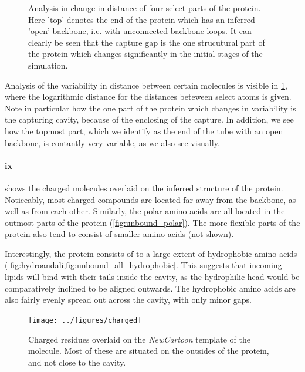 \documentclass[10pt]{article}\usepackage[]{graphicx}\usepackage[]{color}
\theoremstyle{plain}
\begin{document}
\begin{multicols*}{2}
\begin{Schunk}
\begin{figure}[H]
{}

\caption[Analysis in change in distance of four select parts of the protein]{Analysis in change in distance of four select parts of the protein. Here 'top' denotes the end of the protein which has an inferred 'open' backbone, i.e. with unconnected backbone loops. It can clearly be seen that the capture gap is the one strucutural part of the protein which changes significantly in the initial stages of the simulation.}\label{fig:dists}
\end{figure}
\end{Schunk}
		
		
	Analysis of the variability in distance between certain molecules is visible in \cref{fig:dists}, where the logarithmic distance for the distances beteween select atoms is given. Note in particular how the one part of the protein which changes in variability is the capturing cavity, because of the enclosing of the capture. In addition, we see how the topmost part, which we identify as the end of the tube with an open backbone, is contantly very variable, as we also see visually.
		
	\paragraph*{ix}
   shows the charged molecules overlaid on the inferred structure of the protein. Noticeably, most charged compounds are located far away from the backbone, as well as from each other. Similarly, the polar amino acids are all located in the outmost parts of the protein (\cref{fig:unbound_polar}). The more flexible parts of the protein also tend to consist of smaller amino acids (not shown).
		
		Interestingly, the protein consists of to a large extent of hydrophobic amino acids ({\cref{fig:hydroandali,fig:unbound_all_hydrophobic}}. This suggests that incoming lipids will bind with their tails inside the cavity, as the hydrophilic head would be comparatively inclined to be aligned outwards. The hydrophobic amino acids are also fairly evenly spread out across the cavity, with only minor gaps.
		
  \begin{figure}[H]
		\centering
		\texttt{[image: ../figures/charged]}
		\caption{Charged residues overlaid on the \emph{NewCartoon} template of the molecule. Most of these are situated on the outsides of the protein, and not close to the cavity.}
		\label{fig:charged}
	\end{figure}


\end{multicols*}
\end{document}
